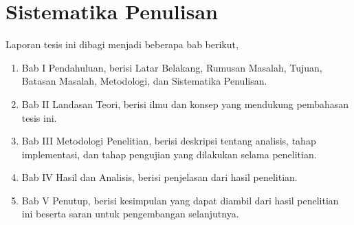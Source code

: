


\section{Sistematika Penulisan}
\label{sec:sistematika-penulisan}

Laporan tesis ini dibagi menjadi beberapa bab berikut,
\begin{enumerate}
	\item Bab I Pendahuluan, berisi Latar Belakang, Rumusan Masalah,
	Tujuan, Batasan Masalah, Metodologi, dan Sistematika Penulisan.
	\item Bab II Landasan Teori, berisi ilmu dan konsep yang mendukung
	pembahasan tesis ini.
	\item Bab III Metodologi Penelitian, berisi deskripsi tentang analisis, tahap implementasi, dan tahap pengujian yang dilakukan selama penelitian.
	\item Bab IV Hasil dan Analisis, berisi penjelasan dari hasil penelitian.
	\item Bab V Penutup, berisi kesimpulan yang dapat diambil dari hasil penelitian ini beserta saran untuk pengembangan selanjutnya.
\end{enumerate}

